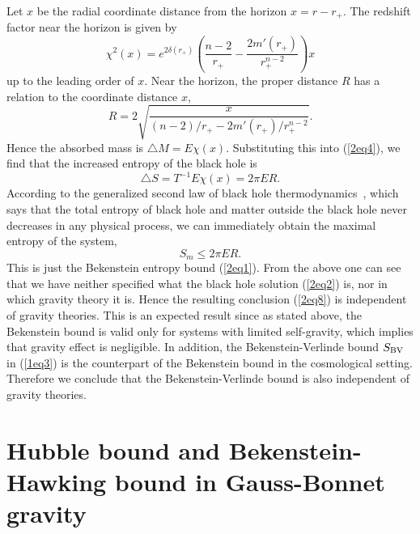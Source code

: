\documentclass[a4paper,12pt]{article}
\newcommand{\sect}[1]{\setcounter{equation}{0}\section{#1}}
\begin{document}
Let $x$ be the radial coordinate distance from the horizon $x=r-r_+$. The redshift
factor near the horizon is given by
\begin{equation}
\label{2eq5}
\chi ^2(x)= e^{2\delta(r_+)}\left( \frac{n-2}{r_+}-\frac{2m'(r_+)}{r_+^{n-2}}
  \right) x
\end{equation}
up to the leading order of $x$. Near the horizon, the proper distance $R$ has a
relation to the coordinate distance $x$,
\begin{equation}
R=2 \sqrt{\frac{x}{(n-2)/r_+ -2m'(r_+)/r_+^{n-2}}}.
\end{equation}
Hence the absorbed mass is $\triangle M = E\chi(x)$. Substituting this
into (\ref{2eq4}), we find that the increased entropy of the black hole
is
\begin{equation}
\label{2eq7}
\triangle S = T^{-1} E \chi (x) = 2\pi ER.
\end{equation}
According to the generalized second law of black hole thermodynamics~\cite{Beke2},
which says that the total entropy of black hole and matter outside the black hole
never decreases in any physical process, we can immediately obtain the maximal
entropy of the system,
\begin{equation}
\label{2eq8}
S_m \le 2\pi ER.
\end{equation}
This is just the Bekenstein entropy bound (\ref{2eq1}).  From the above one can see
that we have neither specified  what the black hole solution (\ref{2eq2}) is,
nor in which gravity theory it is. Hence the resulting conclusion (\ref{2eq8})
is independent of gravity theories. This is an expected result since as stated
above, the Bekenstein
bound is valid only for systems with limited self-gravity, which implies that gravity
effect is negligible.   In addition, the Bekenstein-Verlinde bound $S_{\rm BV}$
in (\ref{1eq3}) is the counterpart of the Bekenstein bound in the cosmological setting.
Therefore we conclude that the Bekenstein-Verlinde bound is also independent of
gravity theories.


\sect{Hubble bound and Bekenstein-Hawking bound in Gauss-Bonnet gravity}
\end{document}
